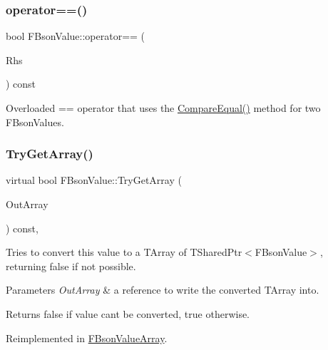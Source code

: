\subsubsection{\texorpdfstring{operator==()}{operator==()}}
{\footnotesize\ttfamily bool F\+Bson\+Value\+::operator== (\begin{DoxyParamCaption}\item[{const \mbox{\hyperlink{class_f_bson_value}{F\+Bson\+Value}} \&}]{Rhs }\end{DoxyParamCaption}) const\hspace{0.3cm}{\ttfamily [inline]}}

Overloaded == operator that uses the \mbox{\hyperlink{class_f_bson_value_a979a25eef93a5f0398ecc372518a5c43}{Compare\+Equal()}} method for two F\+Bson\+Values. \mbox{\label{class_f_bson_value_a80102a8570ea5468895c82f1bc480151}} 
\subsubsection{\texorpdfstring{Try\+Get\+Array()}{TryGetArray()}}
{\footnotesize\ttfamily virtual bool F\+Bson\+Value\+::\+Try\+Get\+Array (\begin{DoxyParamCaption}\item[{const T\+Array$<$ T\+Shared\+Ptr$<$ \mbox{\hyperlink{class_f_bson_value}{F\+Bson\+Value}} $>$$>$ $\ast$\&}]{Out\+Array }\end{DoxyParamCaption}) const\hspace{0.3cm}{\ttfamily [inline]}, {\ttfamily [virtual]}}

Tries to convert this value to a T\+Array of T\+Shared\+Ptr$<$\+F\+Bson\+Value$>$, returning false if not possible.


\begin{DoxyParams}{Parameters}
{\em Out\+Array} & a reference to write the converted T\+Array into. \\
\hline
\end{DoxyParams}
\begin{DoxyReturn}{Returns}
false if value can\textquotesingle{}t be converted, true otherwise. 
\end{DoxyReturn}


Reimplemented in \mbox{\hyperlink{class_f_bson_value_array_a32f100ae460cd26a870fc04d85ffe2c5}{F\+Bson\+Value\+Array}}.

